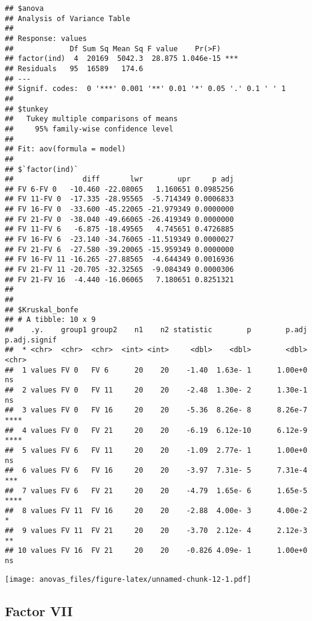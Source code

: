 \documentclass[
]{article}
\begin{document}
\begin{verbatim}
## $anova
## Analysis of Variance Table
## 
## Response: values
##             Df Sum Sq Mean Sq F value    Pr(>F)    
## factor(ind)  4  20169  5042.3  28.875 1.046e-15 ***
## Residuals   95  16589   174.6                      
## ---
## Signif. codes:  0 '***' 0.001 '**' 0.01 '*' 0.05 '.' 0.1 ' ' 1
## 
## $tunkey
##   Tukey multiple comparisons of means
##     95% family-wise confidence level
## 
## Fit: aov(formula = model)
## 
## $`factor(ind)`
##                diff       lwr        upr     p adj
## FV 6-FV 0   -10.460 -22.08065   1.160651 0.0985256
## FV 11-FV 0  -17.335 -28.95565  -5.714349 0.0006833
## FV 16-FV 0  -33.600 -45.22065 -21.979349 0.0000000
## FV 21-FV 0  -38.040 -49.66065 -26.419349 0.0000000
## FV 11-FV 6   -6.875 -18.49565   4.745651 0.4726885
## FV 16-FV 6  -23.140 -34.76065 -11.519349 0.0000027
## FV 21-FV 6  -27.580 -39.20065 -15.959349 0.0000000
## FV 16-FV 11 -16.265 -27.88565  -4.644349 0.0016936
## FV 21-FV 11 -20.705 -32.32565  -9.084349 0.0000306
## FV 21-FV 16  -4.440 -16.06065   7.180651 0.8251321
## 
## 
## $Kruskal_bonfe
## # A tibble: 10 x 9
##    .y.    group1 group2    n1    n2 statistic        p        p.adj p.adj.signif
##  * <chr>  <chr>  <chr>  <int> <int>     <dbl>    <dbl>        <dbl> <chr>       
##  1 values FV 0   FV 6      20    20    -1.40  1.63e- 1      1.00e+0 ns          
##  2 values FV 0   FV 11     20    20    -2.48  1.30e- 2      1.30e-1 ns          
##  3 values FV 0   FV 16     20    20    -5.36  8.26e- 8      8.26e-7 ****        
##  4 values FV 0   FV 21     20    20    -6.19  6.12e-10      6.12e-9 ****        
##  5 values FV 6   FV 11     20    20    -1.09  2.77e- 1      1.00e+0 ns          
##  6 values FV 6   FV 16     20    20    -3.97  7.31e- 5      7.31e-4 ***         
##  7 values FV 6   FV 21     20    20    -4.79  1.65e- 6      1.65e-5 ****        
##  8 values FV 11  FV 16     20    20    -2.88  4.00e- 3      4.00e-2 *           
##  9 values FV 11  FV 21     20    20    -3.70  2.12e- 4      2.12e-3 **          
## 10 values FV 16  FV 21     20    20    -0.826 4.09e- 1      1.00e+0 ns
\end{verbatim}

\texttt{[image: anovas\_files/figure-latex/unnamed-chunk-12-1.pdf]}

\hypertarget{factor-vii}{%
\subsection{Factor VII}\label{factor-vii}}
\end{document}
